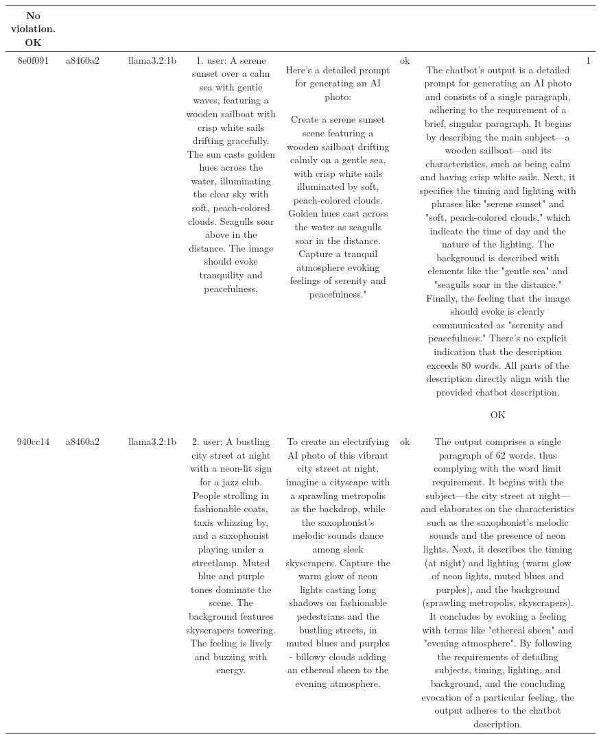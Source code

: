 \begin{table}[h!]
\begin{tabular}{|c|c|c|c|c|c|c|c|c|c|}
No violation. 
OK & \\
\hline
8e0f091 & a8460a2 &  &  & llama3.2:1b & 1. user: A serene sunset over a calm sea with gentle waves, featuring a wooden sailboat with crisp white sails drifting gracefully. The sun casts golden hues across the water, illuminating the clear sky with soft, peach-colored clouds. Seagulls soar above in the distance. The image should evoke tranquility and peacefulness. & Here's a detailed prompt for generating an AI photo: 

Create a serene sunset scene featuring a wooden sailboat drifting calmly on a gentle sea, with crisp white sails illuminated by soft, peach-colored clouds. Golden hues cast across the water as seagulls soar in the distance. Capture a tranquil atmosphere evoking feelings of serenity and peacefulness." & ok & The chatbot's output is a detailed prompt for generating an AI photo and consists of a single paragraph, adhering to the requirement of a brief, singular paragraph. It begins by describing the main subject—a wooden sailboat—and its characteristics, such as being calm and having crisp white sails. Next, it specifies the timing and lighting with phrases like "serene sunset" and "soft, peach-colored clouds," which indicate the time of day and the nature of the lighting. The background is described with elements like the "gentle sea" and "seagulls soar in the distance." Finally, the feeling that the image should evoke is clearly communicated as "serenity and peacefulness." There's no explicit indication that the description exceeds 80 words. All parts of the description directly align with the provided chatbot description.

OK & 1\\
\hline
940cc14 & a8460a2 &  &  & llama3.2:1b & 2. user: A bustling city street at night with a neon-lit sign for a jazz club. People strolling in fashionable coats, taxis whizzing by, and a saxophonist playing under a streetlamp. Muted blue and purple tones dominate the scene. The background features skyscrapers towering. The feeling is lively and buzzing with energy. & To create an electrifying AI photo of this vibrant city street at night, imagine a cityscape with a sprawling metropolis as the backdrop, while the saxophonist's melodic sounds dance among sleek skyscrapers. Capture the warm glow of neon lights casting long shadows on fashionable pedestrians and the bustling streets, in muted blues and purples - billowy clouds adding an ethereal sheen to the evening atmosphere. & ok & The output comprises a single paragraph of 62 words, thus complying with the word limit requirement. It begins with the subject—the city street at night—and elaborates on the characteristics such as the saxophonist's melodic sounds and the presence of neon lights. Next, it describes the timing (at night) and lighting (warm glow of neon lights, muted blues and purples), and the background (sprawling metropolis, skyscrapers). It concludes by evoking a feeling with terms like "ethereal sheen" and "evening atmosphere". By following the requirements of detailing subjects, timing, lighting, and background, and the concluding evocation of a particular feeling, the output adheres to the chatbot description.


\end{tabular}
\end{table}
